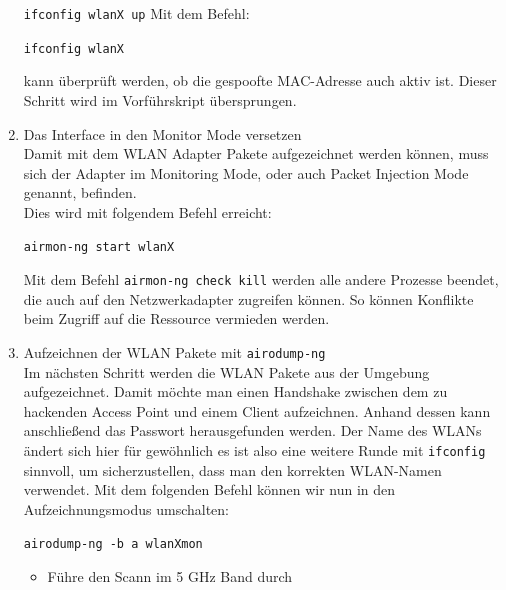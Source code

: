 \begin{enumerate}
	\colorbox{altgray}{\lstinline|ifconfig wlanX up|}\newline
	\newline
	Mit dem Befehl: \newline

	\colorbox{altgray}{\lstinline|ifconfig wlanX|}\newline

	kann überprüft werden, ob die gespoofte MAC-Adresse auch aktiv ist.\newline
	Dieser Schritt wird im Vorführskript übersprungen.

	\item {Das Interface in den Monitor Mode versetzen} \\
	Damit mit dem WLAN Adapter Pakete aufgezeichnet werden können, muss sich der Adapter im Monitoring Mode, oder auch Packet Injection Mode genannt, befinden. \\
	Dies wird mit folgendem Befehl erreicht:

	\colorbox{altgray}{\lstinline|airmon-ng start wlanX|}\newline

	Mit dem Befehl \newline
	\colorbox{altgray}{\lstinline|airmon-ng check kill|}\newline \newline
	werden alle andere Prozesse beendet, die auch auf den Netzwerkadapter zugreifen können. So können Konflikte beim Zugriff auf die Ressource vermieden werden.\newline

	\item {Aufzeichnen der WLAN Pakete mit \colorbox{altgray}{\lstinline|airodump-ng|}}\\
	Im nächsten Schritt werden die WLAN Pakete aus der Umgebung aufgezeichnet. Damit möchte man einen Handshake zwischen dem zu hackenden Access Point und einem Client aufzeichnen. Anhand dessen kann anschließend das Passwort herausgefunden werden. Der Name des WLANs ändert sich hier für gewöhnlich es ist also eine weitere Runde mit \colorbox{altgray}{\lstinline|ifconfig|} sinnvoll, um sicherzustellen, dass man den korrekten WLAN-Namen verwendet. Mit dem folgenden Befehl können wir nun in den Aufzeichnungsmodus umschalten: \newline

	\colorbox{altgray}{\lstinline|airodump-ng -b a wlanXmon|}\newline

	\begin{itemize}
		\item {} Führe den Scann im 5 GHz Band durch
	\end{itemize}


\end{enumerate}
